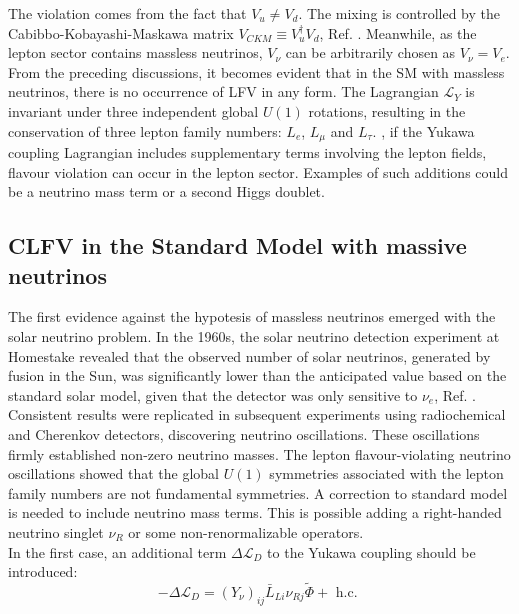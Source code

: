 The violation comes from the fact that $V_u \neq V_d$. The mixing is controlled by the Cabibbo-Kobayashi-Maskawa matrix $V_{CKM}\equiv V^{\dagger}_u V_d $, Ref. \cite{PhysRevLett.10.531}. Meanwhile, as the lepton sector contains massless neutrinos, $V_{\nu}$ can be arbitrarily chosen as $V_{\nu}=V_e$. From the preceding discussions, it becomes evident that in the SM with massless neutrinos, there is no occurrence of LFV in any form. The Lagrangian $\mathscr{L}_Y$ is invariant under three independent global $U(1)$ rotations, resulting in the conservation of three lepton family numbers: $L_e$, $L_\mu$ and $L_\tau$. , if the Yukawa coupling Lagrangian includes supplementary terms involving the lepton fields, flavour violation can occur in the lepton sector. Examples of such additions could be a neutrino mass term or a second Higgs doublet.

\subsection{CLFV in the Standard Model with massive neutrinos}\label{massiveneutrinos}
The first evidence against the hypotesis of massless neutrinos emerged with the solar neutrino problem. In the 1960s, the solar neutrino detection experiment at Homestake revealed that the observed number of solar neutrinos, generated by fusion in the Sun, was significantly lower than the anticipated value based on the standard solar model, given that the detector was only sensitive to $\nu_e$, Ref. \cite{PhysRevLett.20.1205}. Consistent results were replicated in subsequent experiments using radiochemical and Cherenkov detectors, discovering neutrino oscillations. These oscillations firmly established non-zero neutrino masses. The lepton flavour-violating neutrino oscillations showed that the global $U(1)$ symmetries associated with the lepton family numbers are not fundamental symmetries. A correction to standard model is needed to include neutrino mass terms. This is possible adding a right-handed neutrino singlet $\nu_R$ or some non-renormalizable operators.
\\
In the first case, an additional term $\Delta \mathscr{L}_D$ to the Yukawa coupling should be introduced:
\begin{equation}
-\Delta \mathscr{L}_D=\left(Y_\nu\right)_{i j} \bar{L}_{L i} \nu_{Rj} \widetilde{\Phi}+\text { h.c. }
\end{equation}


